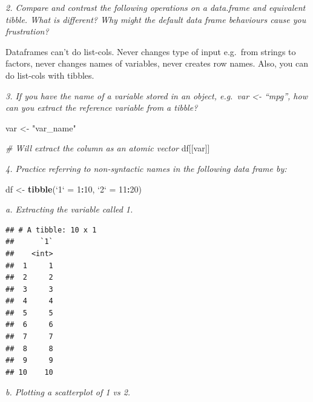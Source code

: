 \documentclass[]{book}
\newenvironment{Shaded}{\begin{snugshade}}{\end{snugshade}}
\newcommand{\CommentTok}[1]{\textcolor[rgb]{0.56,0.35,0.01}{\textit{#1}}}
\newcommand{\DataTypeTok}[1]{\textcolor[rgb]{0.13,0.29,0.53}{#1}}
\newcommand{\DecValTok}[1]{\textcolor[rgb]{0.00,0.00,0.81}{#1}}
\newcommand{\KeywordTok}[1]{\textcolor[rgb]{0.13,0.29,0.53}{\textbf{#1}}}
\newcommand{\NormalTok}[1]{#1}
\newcommand{\OperatorTok}[1]{\textcolor[rgb]{0.81,0.36,0.00}{\textbf{#1}}}
\newcommand{\StringTok}[1]{\textcolor[rgb]{0.31,0.60,0.02}{#1}}
\theoremstyle{definition}
\theoremstyle{definition}
\theoremstyle{definition}
\theoremstyle{remark}
\begin{document}
\emph{2. Compare and contrast the following operations on a data.frame
and equivalent tibble. What is different? Why might the default data
frame behaviours cause you frustration?}

Dataframes can't do list-cols. Never changes type of input e.g.~from
strings to factors, never changes names of variables, never creates row
names. Also, you can do list-cols with tibbles.

\emph{3. If you have the name of a variable stored in an object,
e.g.~var \textless{}- ``mpg'', how can you extract the reference
variable from a tibble?}

\begin{Shaded}
\begin{Highlighting}[]
\NormalTok{var <-}\StringTok{ "var_name"}

\CommentTok{# Will extract the column as an atomic vector}
\NormalTok{df[[var]]}
\end{Highlighting}
\end{Shaded}

\emph{4. Practice referring to non-syntactic names in the following data
frame by:}

\begin{Shaded}
\begin{Highlighting}[]
\NormalTok{df <-}\StringTok{ }\KeywordTok{tibble}\NormalTok{(}\StringTok{`}\DataTypeTok{1}\StringTok{`}\NormalTok{ =}\StringTok{ }\DecValTok{1}\OperatorTok{:}\DecValTok{10}\NormalTok{, }\StringTok{`}\DataTypeTok{2}\StringTok{`}\NormalTok{ =}\StringTok{ }\DecValTok{11}\OperatorTok{:}\DecValTok{20}\NormalTok{)}
\end{Highlighting}
\end{Shaded}

\emph{a. Extracting the variable called 1.}

\begin{Shaded}
\end{Shaded}

\begin{verbatim}
## # A tibble: 10 x 1
##      `1`
##    <int>
##  1     1
##  2     2
##  3     3
##  4     4
##  5     5
##  6     6
##  7     7
##  8     8
##  9     9
## 10    10
\end{verbatim}

\emph{b. Plotting a scatterplot of 1 vs 2.}
\end{document}

